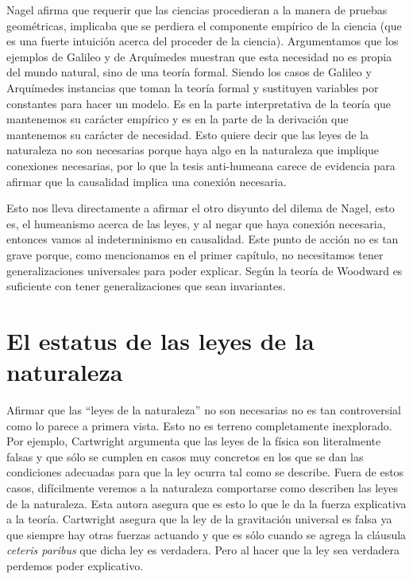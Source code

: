 
Nagel afirma que requerir que las ciencias procedieran a la manera de pruebas geométricas, implicaba que se perdiera el componente empírico de la ciencia (que es una fuerte intuición acerca del proceder de la ciencia). Argumentamos que los ejemplos de Galileo y de Arquímedes muestran que esta necesidad no es propia del mundo natural, sino de una teoría formal. Siendo los casos de Galileo y Arquímedes instancias que toman la teoría formal y sustituyen variables por constantes para hacer un modelo. Es en la parte interpretativa de la teoría que mantenemos su carácter empírico y es en la parte de la derivación que mantenemos su carácter de necesidad. Esto quiere decir que las leyes de la naturaleza no son necesarias porque haya algo en la naturaleza que implique conexiones necesarias, por lo que la tesis anti-humeana carece de evidencia para afirmar que la causalidad implica una conexión necesaria.

Esto nos lleva directamente a afirmar el otro disyunto del dilema de Nagel, esto es, el humeanismo acerca de las leyes, y al negar que haya conexión necesaria, entonces vamos al indeterminismo en causalidad. Este punto de acción no es tan grave porque, como mencionamos en el primer capítulo, no necesitamos tener generalizaciones universales para poder explicar. Según la teoría de Woodward es suficiente con tener generalizaciones que sean invariantes.

\section{El estatus de las leyes de la naturaleza}

\noindent Afirmar que las ``leyes de la naturaleza'' no son necesarias no es tan controversial como lo parece a primera vista. Esto no es terreno completamente inexplorado. Por ejemplo, Cartwright \citeyear{Cartwright1983} argumenta que las leyes de la física son literalmente falsas y que sólo se cumplen en casos muy concretos en los que se dan las condiciones adecuadas para que la ley ocurra tal como se describe. Fuera de estos casos, difícilmente veremos a la naturaleza comportarse como describen las leyes de la naturaleza. Esta autora asegura que es esto lo que le da la fuerza explicativa a la teoría. Cartwright asegura que la ley de la gravitación universal es falsa ya que siempre hay otras fuerzas actuando y que es sólo cuando se agrega la cláusula \textit{ceteris paribus} que dicha ley es verdadera. Pero al hacer que la ley sea verdadera perdemos poder explicativo.

